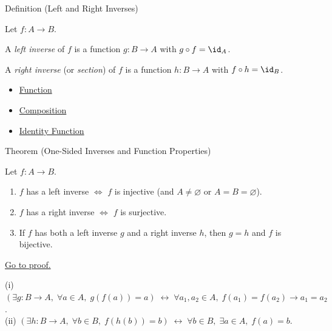 \begin{definitionbox}{Definition (Left and Right Inverses)}
\begin{definition}\label{def:left-right-inverse}
Let $f : A \to B$.

A \emph{left inverse} of $f$ is a function $g : B \to A$ with $g \circ f = \id_A$.

A \emph{right inverse} (or \emph{section}) of $f$ is a function $h : B \to A$
with $f \circ h = \id_B$.
\end{definition}
\end{definitionbox}

\begin{dependencies}
\begin{itemize}
  \item \hyperref[def:function]{Function}
  \item \hyperref[def:composition]{Composition}
  \item \hyperref[def:identity]{Identity Function}
\end{itemize}
\end{dependencies}

\begin{theorembox}{Theorem (One-Sided Inverses and Function Properties)}
\begin{theorem}\label{thm:one-sided}
Let $f : A \to B$.
\begin{enumerate}[label=(\roman*)]
\item $f$ has a left inverse $\iff$ $f$ is injective (and $A \neq \varnothing$ or $A=B=\varnothing$).
\item $f$ has a right inverse $\iff$ $f$ is surjective.
\item If $f$ has both a left inverse $g$ and a right inverse $h$, then $g = h$
and $f$ is bijective.
\end{enumerate}
\hyperref[prf:one-sided]{Go to proof.}
\end{theorem}
\end{theorembox}

\begin{remark*}
(i) $(\exists g: B\to A,\; \forall a\in A,\; g(f(a))=a) \;\leftrightarrow\; \forall a_1,a_2\in A,\; f(a_1)=f(a_2)\to a_1=a_2$.\\
(ii) $(\exists h: B\to A,\; \forall b\in B,\; f(h(b))=b) \;\leftrightarrow\; \forall b\in B,\; \exists a\in A,\; f(a)=b$.
\end{remark*}


